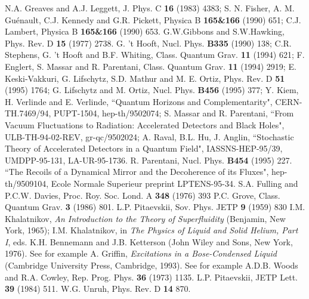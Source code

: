 \documentclass[12pt]{article}
\begin{document}
\begin{thebibliography}{99}
N.A. Greaves and A.J. Leggett, J. Phys. C {\bf 16} (1983) 4383;
S. N. Fisher, A. M. Gu\'enault, C.J. Kennedy and G.R. Pickett,
Physica B {\bf 165\&166} (1990) 651;
C.J. Lambert, Physica B {\bf 165\&166} (1990) 653.
G.W.Gibbons and S.W.Hawking, Phys. Rev. D {\bf 15} (1977) 2738.
G. 't Hooft, Nucl. Phys. {\bf B335} (1990) 138; 
C.R. Stephens, G. 't Hooft and B.F. Whiting, Class. Quantum Grav. {\bf 11}
(1994) 621; 
F. Englert, S. Massar and R. Parentani, Class. Quantum Grav. {\bf 11}
(1994) 2919; 
E. Keski-Vakkuri, G. Lifschytz, S.D. Mathur and M. E. Ortiz, Phys. Rev. D
{\bf 51} (1995) 1764;
G. Lifschytz and M. Ortiz, Nucl. Phys. {\bf B456} (1995) 377;
Y. Kiem, H. Verlinde and E. Verlinde, ``Quantum Horizons and Complementarity",
CERN-TH.7469/94, PUPT-1504, hep-th/9502074;
S. Massar and R. Parentani, ``From Vacuum Fluctuations to Radiation:
Accelerated Detectors and Black Holes", ULB-TH-94-02-REV, gr-qc/9502024;
A. Raval, B.L. Hu, J. Anglin, ``Stochastic Theory of Accelerated
Detectors in a Quantum Field", IASSNS-HEP-95/39, UMDPP-95-131, LA-UR-95-1736.
R. Parentani, Nucl. Phys. {\bf B454} (1995) 227.
 ``The Recoils of a Dynamical Mirror
and the Decoherence of its Fluxes", hep-th/9509104, Ecole Normale Superieur
preprint LPTENS-95-34.
S.A. Fulling and P.C.W. Davies, Proc. Roy. Soc. Lond. A {\bf 348} (1976) 393
P.C. Grove, Class. Quantum Grav. {\bf 3} (1986) 801.
L.P. Pitaevskii, Sov. Phys. JETP {\bf 9} (1959) 830
I.M. Khalatnikov, {\it An Introduction to the Theory of 
Superfluidity} (Benjamin, New York, 1965); 
I.M. Khalatnikov, in {\it The Physics of Liquid and
Solid Helium, Part I}, eds. K.H. Bennemann and J.B. Ketterson (John Wiley and
Sons, New York, 1976).
See for example A. Griffin, {\it Excitations in a Bose-Condensed
Liquid} (Cambridge University Press, Cambridge, 1993).
See for example A.D.B. Woods and R.A. Cowley,
Rep. Prog. Phys. {\bf 36} (1973) 1135.
L.P. Pitaevskii, JETP Lett. {\bf 39} (1984) 511.
W.G. Unruh, Phys. Rev. D {\bf 14} 870.
\end{thebibliography}
\end{document}
